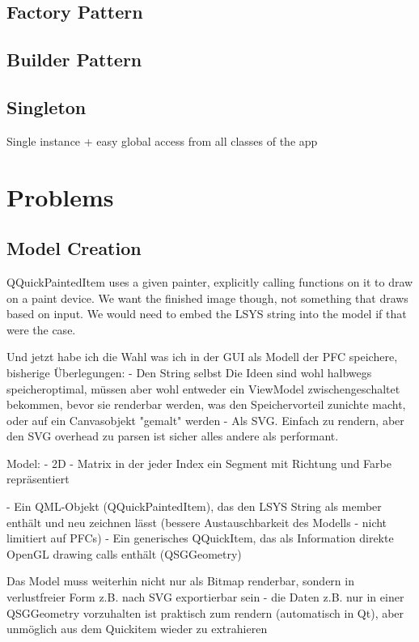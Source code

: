 \subsection{Factory Pattern}

\subsection{Builder Pattern}

\subsection{Singleton}
Single instance + easy global access from all classes of the app


\section{Problems}
\subsection{Model Creation}
QQuickPaintedItem uses a given painter, explicitly calling functions on it to draw on a paint device.
We want the finished image though, not something that draws based on input. We would need to embed the LSYS string into the model if that were the case.

Und jetzt habe ich die Wahl was ich in der GUI als Modell der PFC speichere, bisherige Überlegungen:
- Den String selbst
Die Ideen sind wohl halbwegs speicheroptimal, müssen aber wohl entweder ein ViewModel zwischengeschaltet bekommen, bevor sie renderbar werden, was den Speichervorteil zunichte macht, oder auf ein Canvasobjekt "gemalt" werden
- Als SVG. Einfach zu rendern, aber den SVG overhead zu parsen ist sicher alles andere als performant.

Model: - 2D - Matrix in der jeder Index ein Segment mit Richtung und Farbe repräsentiert

- Ein QML-Objekt (QQuickPaintedItem), das den LSYS String als member enthält und neu zeichnen lässt (bessere Austauschbarkeit des Modells - nicht limitiert auf PFCs)
- Ein generisches QQuickItem, das als Information direkte OpenGL drawing calls enthält (QSGGeometry)

Das Model muss weiterhin nicht nur als Bitmap renderbar, sondern in verlustfreier Form z.B. nach SVG exportierbar sein - die Daten z.B. nur in einer QSGGeometry vorzuhalten ist praktisch zum rendern (automatisch in Qt), aber unmöglich aus dem Quickitem wieder zu extrahieren


